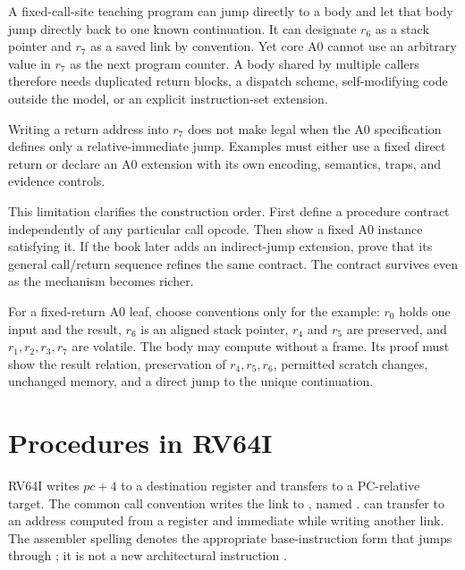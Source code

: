 A fixed-call-site teaching program can jump directly to a body and let that
body jump directly back to one known continuation. It can designate \(r_6\)
as a stack pointer and \(r_7\) as a saved link by convention. Yet core A0
cannot use an arbitrary value in \(r_7\) as the next program counter. A body
shared by multiple callers therefore needs duplicated return blocks, a
dispatch scheme, self-modifying code outside the model, or an explicit
instruction-set extension.

\begin{sidebar}[title={Do not smuggle a return instruction into A0}]
Writing a return address into \(r_7\) does not make  legal when
the A0 specification defines only a relative-immediate jump. Examples must
either use a fixed direct return or declare an A0 extension with its own
encoding, semantics, traps, and evidence controls.
\end{sidebar}

This limitation clarifies the construction order. First define a procedure
contract independently of any particular call opcode. Then show a fixed A0
instance satisfying it. If the book later adds an indirect-jump extension,
prove that its general call/return sequence refines the same contract. The
contract survives even as the mechanism becomes richer.

For a fixed-return A0 leaf, choose conventions only for the example: \(r_0\)
holds one input and the result, \(r_6\) is an aligned stack pointer, \(r_4\)
and \(r_5\) are preserved, and \(r_1,r_2,r_3,r_7\) are volatile. The body may
compute without a frame. Its proof must show the result relation, preservation
of \(r_4,r_5,r_6\), permitted scratch changes, unchanged memory, and a direct
jump to the unique continuation.

\section{Procedures in RV64I}

RV64I  writes \(pc+4\) to a destination register and transfers to a
PC-relative target. The common call convention writes the link to ,
named .  can transfer to an address computed from a
register and immediate while writing another link. The assembler spelling
 denotes the appropriate base-instruction form that jumps through
; it is not a new architectural instruction \autocite{riscv2026unpriv}.

